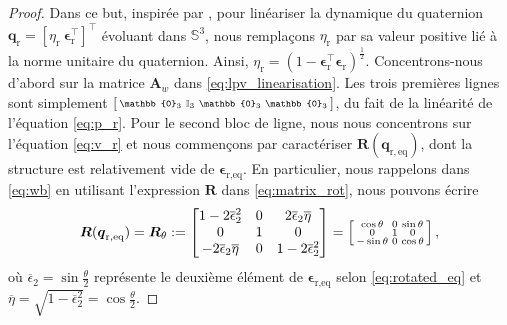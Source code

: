 \begin{proof}
Dans ce but, inspirée par \cite[Proof of Lemma 1]{tregouetHal-01760720}, pour linéariser la dynamique du quaternion $\boldsymbol{q}_{\text{r}} = \left[ \eta_{\text{r}} ~ \boldsymbol{\epsilon}_{\text{r}}^\top \right]^\top$ évoluant dans ${\mathbb S}^3$, nous remplaçons  $\eta_{\text{r}}$ par sa valeur positive lié à la norme unitaire du quaternion. Ainsi, $\eta_{\text{r}} = (1- \boldsymbol{\epsilon}_{\text{r}}^\top \boldsymbol{\epsilon}_{\text{r}})^\frac{1}{2}$.
Concentrons-nous d'abord sur la matrice $\boldsymbol{A}_w$ dans \eqref{eq:lpv_linearisation}. Les trois premières lignes sont simplement $\smallmat{\mathbb{0}_{3} & \mathbb{I}_{3} & \mathbb{0}_{3} &\mathbb{0}_{3}}$, du fait de la linéarité de l'équation \eqref{eq:p_r}. 
Pour le second bloc de ligne, nous nous concentrons sur l'équation \eqref{eq:v_r} et nous commençons par caractériser $\boldsymbol{R}(\boldsymbol{q}_{\mathrm{r,eq}})$, dont la structure est relativement vide de $\boldsymbol{\epsilon}_{\text{r,eq}}$. En particulier, nous rappelons dans \eqref{eq:wb} en utilisant l'expression $\boldsymbol{R}$ dans \eqref{eq:matrix_rot}, nous pouvons écrire
\begin{align*}
    \boldsymbol{R}(\boldsymbol{q}_{\mathrm{r,eq}\textbf{}})= \boldsymbol{R}_\theta :=
     \begin{bmatrix}1-2\overline \epsilon_{2}^{2} & 0 & 2\overline\epsilon_{2} \overline{\eta} \\ 0 & 1 & 0 \\ -2\overline\epsilon_{2} \overline{\eta} & 0 & 1-2\overline\epsilon_{2}^{2} \end{bmatrix}
    = \left[ \begin{smallmatrix} \cos \theta & 0 & \sin \theta \\ 0 & 1 & 0 \\ -\sin \theta & 0 & \cos \theta  \end{smallmatrix} \right],
\end{align*}
où $\overline \epsilon_{2} = \sin{\frac{\theta}{2}}$ représente le deuxième élément de $\boldsymbol{\epsilon}_{\text{r,eq}}$ selon \eqref{eq:rotated_eq} et $ \overline{\eta} = \sqrt{1-\overline \epsilon_{2}^{2}} = \cos{\frac{\theta}{2}}$.


\end{proof}
